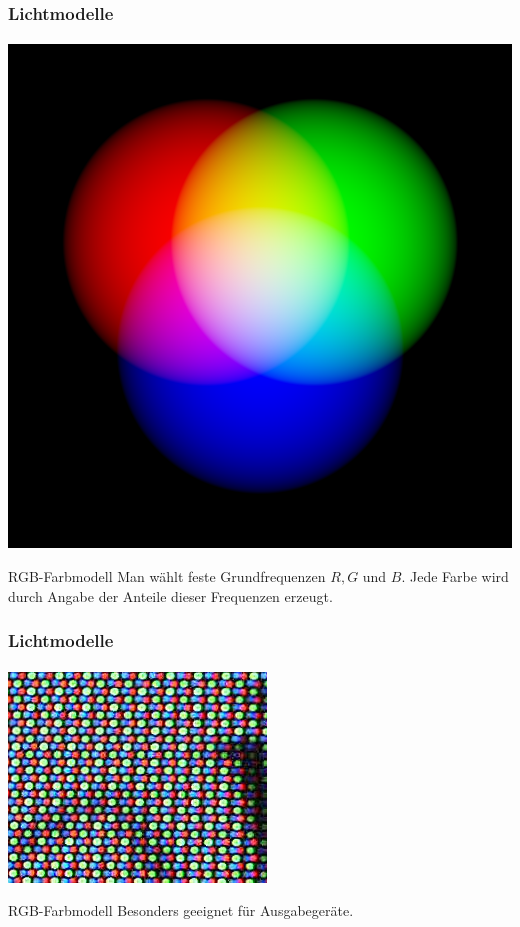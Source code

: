 \documentclass{beamer}
\begin{document}
\begin{frame}
    \frametitle{Lichtmodelle}
\framesubtitle{}
\begin{center}
\includegraphics[scale=0.15]{images/rgb}
\end{center}
    \begin{block}{RGB-Farbmodell}
Man wählt feste Grundfrequenzen $R,G$ und $B$. Jede Farbe wird durch Angabe der Anteile dieser Frequenzen  erzeugt.
\end{block}
\end{frame}



\begin{frame}
    \frametitle{Lichtmodelle}
\framesubtitle{}
\begin{center}
\includegraphics[scale=0.5]{images/monitor}
\end{center}
    \begin{block}{RGB-Farbmodell}
Besonders geeignet für Ausgabegeräte.
\end{block}
\end{frame}
\end{document}
